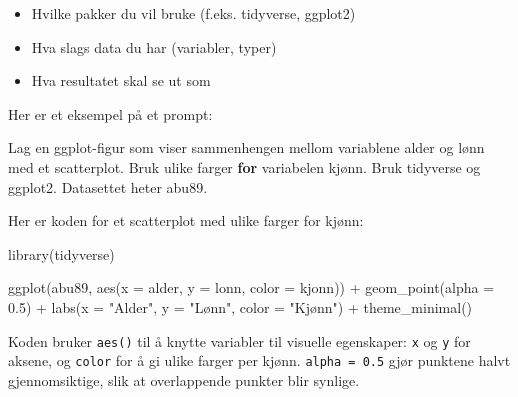 \documentclass[
  norsk,
  letterpaper,
  DIV=11,
  numbers=noendperiod]{scrreprt}
\newenvironment{Shaded}{\begin{snugshade}}{\end{snugshade}}
\newcommand{\AttributeTok}[1]{\textcolor[rgb]{0.40,0.45,0.13}{#1}}
\newcommand{\ControlFlowTok}[1]{\textcolor[rgb]{0.00,0.23,0.31}{\textbf{#1}}}
\newcommand{\FloatTok}[1]{\textcolor[rgb]{0.68,0.00,0.00}{#1}}
\newcommand{\FunctionTok}[1]{\textcolor[rgb]{0.28,0.35,0.67}{#1}}
\newcommand{\NormalTok}[1]{\textcolor[rgb]{0.00,0.23,0.31}{#1}}
\newcommand{\SpecialCharTok}[1]{\textcolor[rgb]{0.37,0.37,0.37}{#1}}
\newcommand{\StringTok}[1]{\textcolor[rgb]{0.13,0.47,0.30}{#1}}
\providecommand{\tightlist}{%
  \setlength{\itemsep}{0pt}\setlength{\parskip}{0pt}}
\theoremstyle{definition}
\theoremstyle{remark}
\begin{document}
\begin{itemize}
\tightlist
\item
  Hvilke pakker du vil bruke (f.eks. tidyverse, ggplot2)
\item
  Hva slags data du har (variabler, typer)
\item
  Hva resultatet skal se ut som
\end{itemize}

Her er et eksempel på et prompt:

\begin{Shaded}
\begin{Highlighting}[]
\NormalTok{Lag en ggplot}\SpecialCharTok{{-}}\NormalTok{figur som viser sammenhengen mellom}
\NormalTok{variablene alder og lønn med et scatterplot.}
\NormalTok{Bruk ulike farger }\ControlFlowTok{for}\NormalTok{ variabelen kjønn.}
\NormalTok{Bruk tidyverse og ggplot2. Datasettet heter abu89.}
\end{Highlighting}
\end{Shaded}

\begin{tcolorbox}[enhanced jigsaw, breakable, colbacktitle=quarto-callout-note-color!10!white, arc=.35mm, leftrule=.75mm, bottomrule=.15mm, colback=white, coltitle=black, opacityback=0, toptitle=1mm, title=\textcolor{quarto-callout-note-color}{\faInfo}\hspace{0.5em}{Eksempel på svar fra KI-verktøy}, colframe=quarto-callout-note-color-frame, toprule=.15mm, opacitybacktitle=0.6, titlerule=0mm, bottomtitle=1mm, rightrule=.15mm, left=2mm]

Her er koden for et scatterplot med ulike farger for kjønn:

\begin{Shaded}
\begin{Highlighting}[]
\FunctionTok{library}\NormalTok{(tidyverse)}

\FunctionTok{ggplot}\NormalTok{(abu89, }\FunctionTok{aes}\NormalTok{(}\AttributeTok{x =}\NormalTok{ alder, }\AttributeTok{y =}\NormalTok{ lonn, }\AttributeTok{color =}\NormalTok{ kjonn)) }\SpecialCharTok{+}
  \FunctionTok{geom\_point}\NormalTok{(}\AttributeTok{alpha =} \FloatTok{0.5}\NormalTok{) }\SpecialCharTok{+}
  \FunctionTok{labs}\NormalTok{(}\AttributeTok{x =} \StringTok{"Alder"}\NormalTok{, }\AttributeTok{y =} \StringTok{"Lønn"}\NormalTok{, }\AttributeTok{color =} \StringTok{"Kjønn"}\NormalTok{) }\SpecialCharTok{+}
  \FunctionTok{theme\_minimal}\NormalTok{()}
\end{Highlighting}
\end{Shaded}

Koden bruker \texttt{aes()} til å knytte variabler til visuelle
egenskaper: \texttt{x} og \texttt{y} for aksene, og \texttt{color} for å
gi ulike farger per kjønn. \texttt{alpha\ =\ 0.5} gjør punktene halvt
gjennomsiktige, slik at overlappende punkter blir synlige.

\end{tcolorbox}
\end{document}
